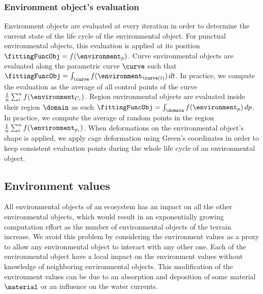 \subsubsection{Environment object's evaluation}
\label{EnvironmentObjects-sec:obj-evaluation}
Environment objects are evaluated at every iteration in order to determine the current state of the life cycle of the environmental object. For punctual environmental objects, this evaluation is applied at its position $\fittingFuncObj = f(\environment_{p})$. Curve environmental objects are evaluated along the parametric curve $\curve$ such that $\fittingFuncObj = \int_{\curve} f(\environment_{\curve(t)}) \,dt$. In practice, we compute the evaluation as the average of all control points of the curve $\frac{1}{n} \sum_{i}^{n}{f(\environment_{C_i})}$.
Region environmental objects are evaluated inside their region $\domain$ as such $\fittingFuncObj = \int_{\domain} f(\environment_p) \,dp$. In practice, we compute the average of random points in the region $\frac{1}{n} \sum_{i}^{n}{f(\environment_{p_i})}$. When deformations on the environmental object's shape is applied, we apply cage deformation using Green's coordinates in order to keep consistent evaluation points during the whole life cycle of an environmental object.


\subsection{Environment values}
\label{EnvironmentObjects-sec:communication}
All environmental objects of an ecosystem has an impact on all the other environmental objects, which would result in an exponentially growing computation effort as the number of environmental objects of the terrain increase. We avoid this problem by considering the environment values as a proxy to allow any environmental object to interact with any other one. Each of the environmental object have a local impact on the environment values without knowledge of neighboring environmental objects. This modification of the environment values can be due to an absorption and deposition of some material $\material$ or an influence on the water currents.


